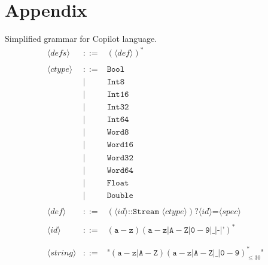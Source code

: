 \documentclass[a4paper,11pt,final]{article}
\begin{document}
	\section*{Appendix}
	\begin{minipage}{\textwidth}
		\tiny
		\begin{multicols}{2}
			{\normalsize Simplified grammar for Copilot language.}
			$$ \begin{array}{lcl}
			\langle defs \rangle & ::= & (\langle def \rangle)^* \\
			& & \\
			\langle ctype \rangle & ::= & \texttt{Bool} \\  
			& | & \texttt{Int8} \\
			& | & \texttt{Int16} \\ 
			& | & \texttt{Int32} \\
			& | & \texttt{Int64} \\
			& | & \texttt{Word8} \\ 
			& | & \texttt{Word16} \\
			& | & \texttt{Word32} \\
			& | & \texttt{Word64} \\
			& | & \texttt{Float} \\
			& | & \texttt{Double} \\
			& & \\
			\langle def \rangle & ::= & (\langle id \rangle \texttt{::} \texttt{Stream } \langle ctype \rangle)? \langle id \rangle \texttt{=}\langle spec \rangle \\
			& & \\
			\langle id \rangle & ::= & (\texttt{a}-\texttt{z})(\texttt{a}-\texttt{z}|\texttt{A}-\texttt{Z}|\texttt{0}-\texttt{9}|\_|\texttt{-}|\texttt{'})^* \\
			& & \\
			& & \\
			\langle string \rangle & ::= & \texttt{"}(\texttt{a}-\texttt{z}|\texttt{A}-\texttt{Z})(\texttt{a}-\texttt{z}|\texttt{A}-\texttt{Z}|\texttt{\_}|\texttt{0}-\texttt{9})_{\leq 30}^*\texttt{"} \\

\end{array}$$
\end{multicols}
\end{minipage}
\end{document}
